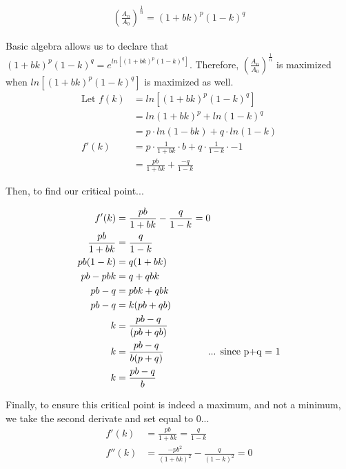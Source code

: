 \documentclass [MS] {uclathes}
\begin{document}
\noindent {} \\
\noindent {}
\begin{equation*}
\begin{split}
\left(\frac{A_n}{A_0}\right)^\frac{1}{n} = (1+bk)^p(1-k)^q 
\end{split}
\end{equation*}

Basic algebra allows us to declare that $(1+bk)^p(1-k)^q = e^{ln[(1+bk)^p(1-k)^q]}$. Therefore, $\left(\frac{A_n}{A_0}\right)^\frac{1}{n}$ is maximized when $ln[(1+bk)^p(1-k)^q]$ is maximized as well. 
\begin{equation*} \label{eq:kc-deriv2}
\begin{split}
\text{Let } f(k) &= ln[(1+bk)^p(1-k)^q] \\
&= ln(1+bk)^p + ln(1-k)^q \\
&= p \cdot ln(1-bk) + q \cdot ln(1-k) \\
f'(k) &= p \cdot \frac{1}{1+bk} \cdot b + q \cdot  \frac{1}{1-k} \cdot  -1 \\
&= \frac{pb}{1+bk} + \frac{-q}{1-k} 
\end{split}
\end{equation*}

Then, to find our critical point...

\begin{equation*} \label{eq:kc-deriv3}
\begin{split}
f'(k) &= \frac{pb}{1+bk} - \frac{q}{1-k} = 0 \\
\frac{pb}{1+bk} &= \frac{q}{1-k} \\
pb(1-k) &= q(1+bk) \\
pb - pbk &= q + qbk \\ 
pb - q &= pbk + qbk \\ 
pb - q &= k(pb + qb) \\
k &= \frac{pb-q}{(pb+qb)} \\ 
k &= \frac{pb-q}{b(p+q)} \hspace{1.5cm} \text{  ... since p+q = 1} \\
k &= \frac{pb-q}{b}
\end{split}
\end{equation*}

Finally, to ensure this critical point is indeed a maximum, and not a minimum, we take the second derivate and set equal to 0...
\begin{equation*} \label{eq:kc-deriv3}
\begin{split}
f'(k) &=\frac{pb}{1+bk} = \frac{q}{1-k}  \\
f''(k) &= \frac{-pb^2}{(1+bk)^2} - \frac{q}{(1-k)^2} = 0\\
\end{split}
\end{equation*}
\end{document}
